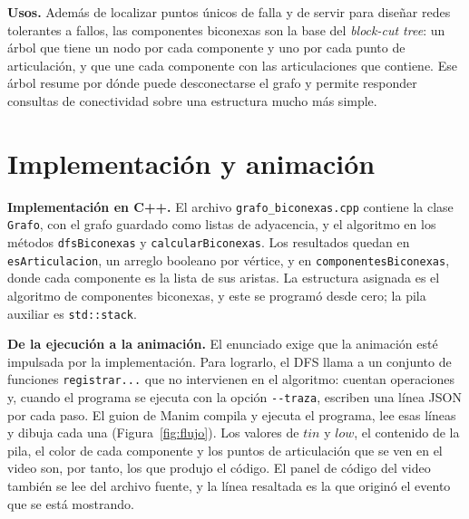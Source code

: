 \documentclass[11pt,a4paper]{article}
\numberwithin{equation}{section}
\newcommand{\tin}{\mathit{tin}}
\newcommand{\low}{\mathit{low}}
\begin{document}
\textbf{Usos.} Además de localizar puntos únicos de falla y de servir para diseñar redes tolerantes a fallos, las componentes biconexas son la base del \emph{block-cut tree}: un árbol que tiene un nodo por cada componente y uno por cada punto de articulación, y que une cada componente con las articulaciones que contiene. Ese árbol resume por dónde puede desconectarse el grafo y permite responder consultas de conectividad sobre una estructura mucho más simple.

\section{Implementación y animación}
\label{sec:implementacion}
\textbf{Implementación en C++.} El archivo \texttt{grafo\_biconexas.cpp} contiene la clase \texttt{Grafo}, con el grafo guardado como listas de adyacencia, y el algoritmo en los métodos \texttt{dfsBiconexas} y \texttt{calcularBiconexas}. Los resultados quedan en \texttt{esArticulacion}, un arreglo booleano por vértice, y en \texttt{componentesBiconexas}, donde cada componente es la lista de sus aristas. La estructura asignada es el algoritmo de componentes biconexas, y este se programó desde cero; la pila auxiliar es \texttt{std::stack}.

\textbf{De la ejecución a la animación.} El enunciado exige que la animación esté impulsada por la implementación. Para lograrlo, el DFS llama a un conjunto de funciones \texttt{registrar...} que no intervienen en el algoritmo: cuentan operaciones y, cuando el programa se ejecuta con la opción \texttt{-{}-traza}, escriben una línea JSON por cada paso. El guion de Manim compila y ejecuta el programa, lee esas líneas y dibuja cada una (Figura~\ref{fig:flujo}). Los valores de $\tin$ y $\low$, el contenido de la pila, el color de cada componente y los puntos de articulación que se ven en el video son, por tanto, los que produjo el código. El panel de código del video también se lee del archivo fuente, y la línea resaltada es la que originó el evento que se está mostrando.
\end{document}
